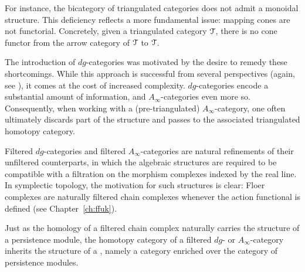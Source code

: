 For instance, the bicategory of triangulated categories does not admit a monoidal structure. This deficiency reflects a more fundamental issue: mapping cones are not functorial. Concretely, given a triangulated category $\mathcal{T}$, there is no cone functor from the arrow category of $\mathcal{T}$ to $\mathcal{T}$.

The introduction of $dg$-categories was motivated by the desire to remedy these shortcomings. While this approach is successful from several perspectives (again, see \cite{KellerICM}), it comes at the cost of increased complexity. $dg$-categories encode a substantial amount of information, and $A_\infty$-categories even more so. Consequently, when working with a (pre-triangulated) $A_\infty$-category, one often ultimately discards part of the structure and passes to the associated triangulated homotopy category.

Filtered $dg$-categories and filtered $A_\infty$-categories are natural refinements of their unfiltered counterparts, in which the algebraic structures are required to be compatible with a filtration on the morphism complexes indexed by the real line. In symplectic topology, the motivation for such structures is clear: Floer complexes are naturally filtered chain complexes whenever the action functional is defined (see Chapter~\ref{ch:ffuk}). 

Just as the homology of a filtered chain complex naturally carries the structure of a persistence module, the homotopy category of a filtered $dg$- or $A_\infty$-category inherits the structure of a , namely a category enriched over the category of persistence modules.
